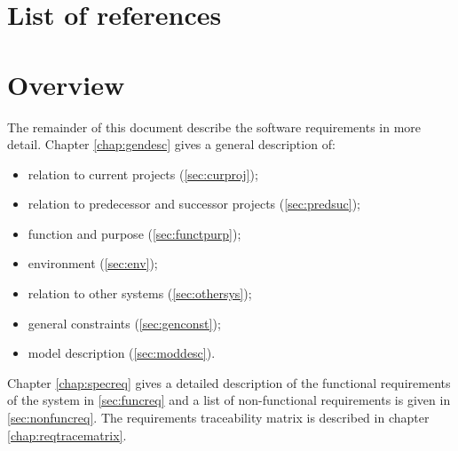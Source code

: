 \section{List of references}


\section{Overview}
The remainder of this document describe the software requirements in more detail. Chapter \ref{chap:gendesc} gives a general description of:
\begin{itemize}
\item relation to current projects (\ref{sec:curproj});
\item relation to predecessor and successor projects (\ref{sec:predsuc});
\item function and purpose (\ref{sec:functpurp});
\item environment (\ref{sec:env});
\item relation to other systems (\ref{sec:othersys});
\item general constraints (\ref{sec:genconst});
\item model description (\ref{sec:moddesc}).
\end{itemize}
Chapter \ref{chap:specreq} gives a detailed description of the functional requirements of the system in \ref{sec:funcreq} and a list of non-functional requirements is given in \ref{sec:nonfuncreq}. The requirements traceability matrix is described in chapter \ref{chap:reqtracematrix}.
